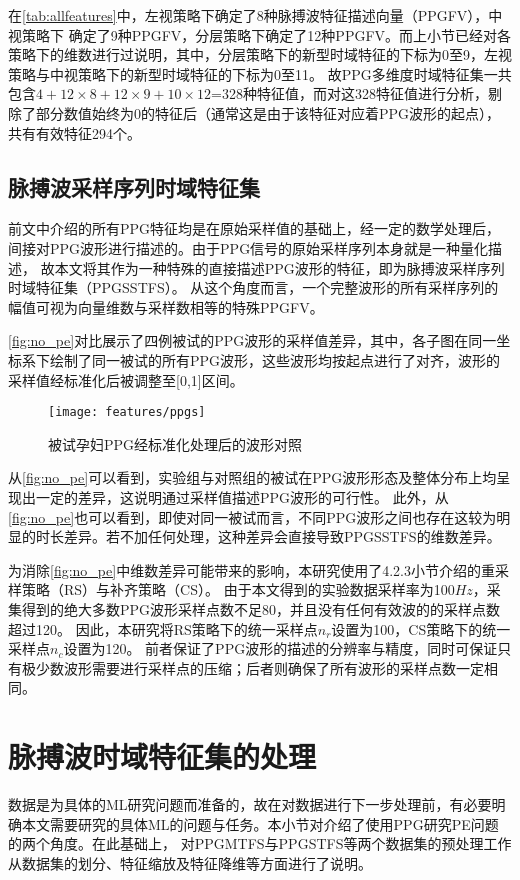 在\autoref{tab:allfeatures}中，左视策略下确定了8种脉搏波特征描述向量（PPGFV），中视策略下
确定了9种PPGFV，分层策略下确定了12种PPGFV。而上小节已经对各策略下的维数进行过说明，其中，分层策略下的新型时域特征的下标为0至9，左视策略与中视策略下的新型时域特征的下标为0至11。
故PPG多维度时域特征集一共包含$4+12 \times 8+ 12 \times 9 + 10 \times 12$=328种特征值，而对这328特征值进行分析，剔除了部分数值始终为0的特征后（通常这是由于该特征对应着PPG波形的起点），
共有有效特征294个。

\subsection{脉搏波采样序列时域特征集}

前文中介绍的所有PPG特征均是在原始采样值的基础上，经一定的数学处理后，间接对PPG波形进行描述的。由于PPG信号的原始采样序列本身就是一种量化描述，
故本文将其作为一种特殊的直接描述PPG波形的特征，即为脉搏波采样序列时域特征集（PPGSSTFS）。
从这个角度而言，一个完整波形的所有采样序列的幅值可视为向量维数与采样数相等的特殊PPGFV。

\autoref{fig:no_pe}对比展示了四例被试的PPG波形的采样值差异，其中，各子图在同一坐标系下绘制了同一被试的所有PPG波形，这些波形均按起点进行了对齐，波形的采样值经标准化后被调整至[0,1]区间。

\begin{figure}[htbp]
  \centering
  \texttt{[image: features/ppgs]}
  \caption{\label{fig:no_pe}被试孕妇PPG经标准化处理后的波形对照}
\end{figure}

从\autoref{fig:no_pe}可以看到，实验组与对照组的被试在PPG波形形态及整体分布上均呈现出一定的差异，这说明通过采样值描述PPG波形的可行性。
此外，从\autoref{fig:no_pe}也可以看到，即使对同一被试而言，不同PPG波形之间也存在这较为明显的时长差异。若不加任何处理，这种差异会直接导致PPGSSTFS的维数差异。

为消除\autoref{fig:no_pe}中维数差异可能带来的影响，本研究使用了4.2.3小节介绍的重采样策略（RS）与补齐策略（CS）。
由于本文得到的实验数据采样率为100$Hz$，采集得到的绝大多数PPG波形采样点数不足80，并且没有任何有效波的的采样点数超过120。
因此，本研究将RS策略下的统一采样点$n_r$设置为100，CS策略下的统一采样点$n_c$设置为120。
前者保证了PPG波形的描述的分辨率与精度，同时可保证只有极少数波形需要进行采样点的压缩；后者则确保了所有波形的采样点数一定相同。

\section{脉搏波时域特征集的处理}
数据是为具体的ML研究问题而准备的，故在对数据进行下一步处理前，有必要明确本文需要研究的具体ML的问题与任务。本小节对介绍了使用PPG研究PE问题的两个角度。在此基础上，
对PPGMTFS与PPGSTFS等两个数据集的预处理工作从数据集的划分、特征缩放及特征降维等方面进行了说明。

